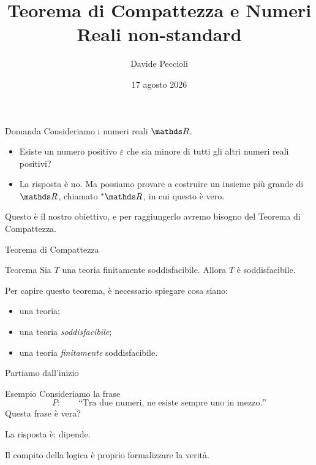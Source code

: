 \documentclass[babel]{beamer}
\institute[]{Università degli Studi di Torino}
\author{Davide Peccioli}
\date{17 agosto 2026}
\title[Compattezza e \(\null^*\R\)]{Teorema di Compattezza e Numeri Reali non-standard}
\begin{document}
\maketitle
\begin{frame}[label={sec:org0f88330}]{Domanda}
Consideriamo i numeri reali \(\R\).

\begin{itemize}
\item Esiste un numero positivo \(\varepsilon\) che sia \alert{minore} di tutti gli altri numeri reali positivi?
\item La risposta è \alert{no}. Ma possiamo provare a costruire un insieme più grande di \(\R\), chiamato \(\null^{*}{\R}\), in cui questo è vero.
\end{itemize}

Questo è il nostro obiettivo, e per raggiungerlo avremo bisogno del \alert{Teorema di Compattezza}.
\end{frame}
\begin{frame}[label={sec:orgb036e09}]{Teorema di Compattezza}
\begin{block}{Teorema}
Sia \(T\) una teoria finitamente soddisfacibile. Allora \(T\) è soddisfacibile.
\end{block}
Per capire questo teorema, è necessario spiegare cosa siano:
\begin{itemize}
\item una teoria;
\item una teoria \emph{soddisfacibile};
\item una teoria \emph{finitamente} soddisfacibile.
\end{itemize}
\end{frame}
\begin{frame}[label={sec:orgf9283c5}]{Partiamo dall'inizio}
\begin{block}{Esempio}
Consideriamo la frase
\begin{equation*}
P:\qquad \text{``Tra due numeri, ne esiste sempre uno in mezzo.''}
\end{equation*}
Questa frase \alert{è vera}?
\end{block}
La risposta è: \alert{dipende}.

Il compito della logica è proprio formalizzare la verità.
\end{frame}
\end{document}
